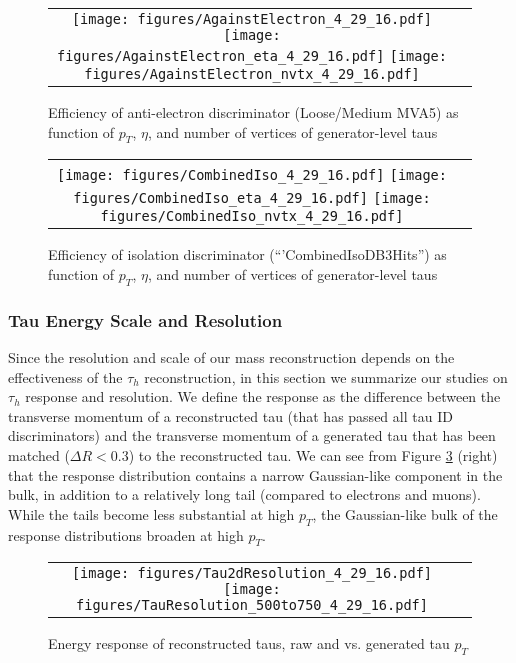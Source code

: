 \begin{figure}[tbh!]
    \centering
    \begin{tabular}{cc}
      \texttt{[image: figures/AgainstElectron\_4\_29\_16.pdf]}
      \texttt{[image: figures/AgainstElectron\_eta\_4\_29\_16.pdf]}
       \texttt{[image: figures/AgainstElectron\_nvtx\_4\_29\_16.pdf]}
    \end{tabular}
    \caption{Efficiency of anti-electron discriminator (Loose/Medium MVA5) as function of $p_{T}$, $\eta$, and number of vertices of generator-level taus }
    \label{fig:EM5}
  \end{figure}

\begin{figure}[tbh!]
    \centering
    \begin{tabular}{cc}
      \texttt{[image: figures/CombinedIso\_4\_29\_16.pdf]}
      \texttt{[image: figures/CombinedIso\_eta\_4\_29\_16.pdf]}
       \texttt{[image: figures/CombinedIso\_nvtx\_4\_29\_16.pdf]}
    \end{tabular}
    \caption{Efficiency of isolation discriminator (``'CombinedIsoDB3Hits'') as function of $p_{T}$, $\eta$, and number of vertices of generator-level taus }
    \label{fig:TIso}
  \end{figure}



\subsubsection{Tau Energy Scale and Resolution}

Since the resolution and scale of our mass reconstruction depends on the effectiveness of the $\tau_{h}$ reconstruction, in this section we summarize our studies on $\tau_{h}$ response and resolution. We define the response as the difference between the transverse momentum of a reconstructed tau (that has passed all tau ID discriminators) and the transverse momentum of a generated tau that has been matched ($\Delta R < 0.3$) to the reconstructed tau. We can see from Figure \ref{fig:Tau2dResolution} (right) that the response distribution contains a narrow Gaussian-like component in the bulk, in addition to a relatively long tail (compared to electrons and muons). While the tails become less substantial at high $p_{T}$, the Gaussian-like bulk of the response distributions broaden at high $p_{T}$.
 
\begin{figure}[tbh!]
  \centering
  \begin{tabular}{cc}
  \texttt{[image: figures/Tau2dResolution\_4\_29\_16.pdf]}
  \texttt{[image: figures/TauResolution\_500to750\_4\_29\_16.pdf]}
  \end{tabular}
  \caption{Energy response of reconstructed taus, raw and vs. generated tau $p_{T}$}
  \label{fig:Tau2dResolution}
\end{figure}


